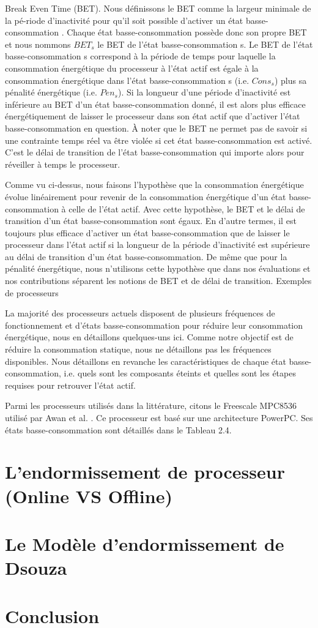 Break Even Time (BET). Nous définissons le BET comme la largeur minimale de la pé-riode d’inactivité pour qu’il soit possible d’activer un état basse-consommation \cite{AP11, CG06, DA08a}.
 Chaque état basse-consommation possède donc son propre BET et nous nommons $BET_s$ le BET de l’état basse-consommation s. 
 Le BET de l’état basse-consommation s correspond à la période de temps pour laquelle la consommation énergétique du processeur à l’état actif est égale à la consommation énergétique
 dans l’état basse-consommation s (i.e. $Cons_s$) plus sa pénalité énergétique (i.e. $Pen_s$). Si la longueur d’une période d’inactivité est inférieure au BET d’un état basse-consommation
 donné, il est alors plus eﬃcace énergétiquement de laisser le processeur dans son état actif que d’activer l’état basse-consommation en question. À noter que le BET ne permet pas de savoir 
 si une contrainte temps réel va être violée si cet état basse-consommation est activé. C’est le délai de transition de l’état basse-consommation qui importe alors pour réveiller à temps le processeur.

Comme vu ci-dessus, nous faisons l’hypothèse que la consommation énergétique évolue linéairement pour revenir de la consommation énergétique d’un état basse-consommation à celle de l’état actif. 
Avec cette hypothèse, le BET et le délai de transition d’un état basse-consommation sont égaux. 
En d’autre termes, il est toujours plus eﬃcace d’activer un état basse-consommation que de laisser le processeur dans l’état actif si la longueur de la période d’inactivité 
est supérieure au délai de transition d’un état basse-consommation. De même que pour la pénalité énergétique, nous n’utilisons cette hypothèse que dans nos évaluations et 
nos contributions séparent les notions de BET et de délai de transition.
Exemples de processeurs

La majorité des processeurs actuels disposent de plusieurs fréquences de fonctionnement et d’états basse-consommation pour réduire leur consommation énergétique, nous en détaillons quelques-uns ici. Comme notre objectif est de réduire la consommation statique, nous ne détaillons pas les fréquences disponibles. Nous détaillons en revanche les caractéristiques de chaque état basse-consommation, i.e. quels sont les composants éteints et quelles sont les étapes requises pour retrouver l’état actif.

Parmi les processeurs utilisés dans la littérature, citons le Freescale MPC8536 \cite{MPC} utilisé par Awan et al. \cite{AP11, AP13, AYP13}. Ce processeur est basé sur une architecture PowerPC. Ses états basse-consommation sont détaillés dans le Tableau 2.4.
\section{L'endormissement de processeur (Online VS Offline)}
\vspace{-1cm}
\section{Le Modèle d'endormissement de Dsouza}
\vspace{-1cm}
\section{Conclusion}
\vspace{-1cm}